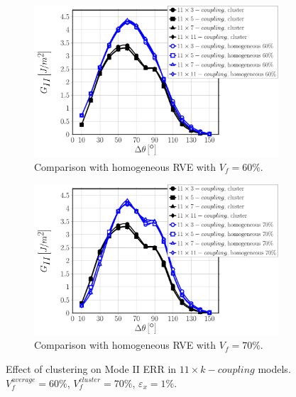\documentclass[review]{elsarticle}
\begin{document}
\begin{figure}[!h]
\centering
    \begin{subfigure}[b]{0.475\textwidth}
        \includegraphics[width=\textwidth]{11xk-coupling-vf60-GII.pdf}
        \caption{Comparison with homogeneous RVE with $V_{f}=60\%$.}\label{subfig:clusterCoupling11xkModeII60}
    \end{subfigure}\quad
    \begin{subfigure}[b]{0.475\textwidth}
        \includegraphics[width=\textwidth]{11xk-coupling-vf70-GII.pdf}
        \caption{Comparison with homogeneous RVE with $V_{f}=70\%$.}\label{subfig:clusterCoupling11xkModeII70}
    \end{subfigure}

\caption{Effect of clustering on Mode II ERR in $11\times k-coupling$ models. $V^{average}_{f}=60\%$, $V^{cluster}_{f}=70\%$, $\varepsilon_{x}=1\%$.}\label{fig:clusterCoupling11xkModeII}
\end{figure}
\end{document}
